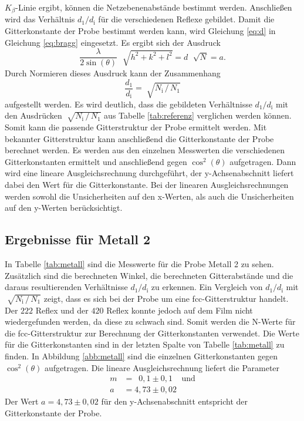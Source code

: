 $K_\beta$-Linie ergibt, können die Netzebenenabstände bestimmt werden. Anschließen wird das Verhältnis $d_1 / d_\text{i}$ für die verschiedenen Reflexe gebildet.\newline
Damit die Gitterkonstante der Probe bestimmt werden kann, wird Gleichung \eqref{eq:d} in Gleichung \eqref{eq:bragg} eingesetzt. Es ergibt sich der Ausdruck
\begin{equation}
  \frac{\lambda}{2\sin(\theta)}\,\,\sqrt[]{h^2+k^2+l^2}=d\,\,\sqrt[]{N}=a.
\end{equation}
Durch Normieren dieses Ausdruck kann der Zusammenhang
\begin{equation}
\frac{d_1}{d_\text{i}}=\sqrt[]{N_\text{i}\, / \, N_1}
\end{equation}
aufgestellt werden. Es wird deutlich, dass die gebildeten Verhältnisse $d_1 / d_\text{i}$ mit den Ausdrücken $\sqrt[]{N_\text{i}\, / \, N_1}$ aus Tabelle
\ref{tab:referenz} verglichen werden können. Somit kann die passende Gitterstruktur der Probe ermittelt werden.
Mit bekannter Gitterstruktur kann anschließend die Gitterkonstante der Probe berechnet werden. Es werden aus den einzelnen Messwerten die verschiedenen
Gitterkonstanten ermittelt und anschließend gegen $\cos^2(\theta)$ aufgetragen. Dann wird eine lineare Ausgleichsrechnung durchgeführt, der y-Achsenabschnitt
liefert dabei den Wert für die Gitterkonstante. Bei der linearen Ausgleichsrechnungen werden sowohl die Unsicherheiten auf den x-Werten, als auch die Unsicherheiten auf
den y-Werten berücksichtigt.

\subsection{Ergebnisse für Metall 2}

In Tabelle \ref{tab:metall} sind die Messwerte für die Probe Metall 2 zu sehen. Zusätzlich sind die berechneten Winkel, die berechneten Gitterabstände und die
daraus resultierenden Verhältnisse $d_1 / d_\text{i}$ zu erkennen.\newline
Ein Vergleich von $d_1 / d_\text{i}$ mit $\sqrt[]{N_\text{i}\, / \, N_1}$ zeigt, dass es sich bei der Probe um eine fcc-Gitterstruktur handelt. Der $222$ Reflex und
der $420$ Reflex konnte jedoch auf dem Film nicht wiedergefunden werden, da diese zu schwach sind.
Somit werden die
N-Werte für die fcc-Gitterstruktur zur Berechnung der Gitterkonstanten verwendet. Die Werte für die Gitterkonstanten sind in der letzten Spalte von
Tabelle \ref{tab:metall} zu finden. In Abbildung \ref{abb:metall} sind die einzelnen Gitterkonstanten gegen $\cos^2(\theta)$ aufgetragen. Die lineare Ausgleichsrechnung liefert
die Parameter
\begin{align*}
  m &= \,\,\,0,1\pm0,1~~~~~\text{und}\\
  a &= 4,73\pm0,02
\end{align*}
Der Wert $a = 4,73\pm0,02$ für den y-Achsenabschnitt entspricht der Gitterkonstante der Probe.


